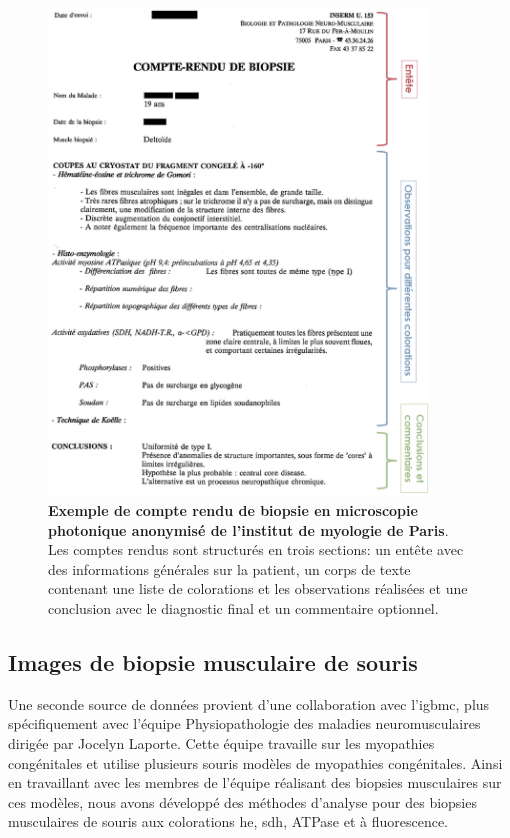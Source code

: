 \begin{figure}[!htbp]
 \centering
 \includegraphics[width=0.9\textwidth]{figures/compte_rendu_exemple.png}
 \caption[Exemple de compte rendu de biopsie]{\textbf{Exemple de compte rendu de biopsie en microscopie photonique anonymisé de l'institut de myologie de Paris}. Les comptes rendus sont structurés en trois sections: un entête avec des informations générales sur la patient, un corps de texte contenant une liste de colorations et les observations réalisées et une conclusion avec le diagnostic final et un commentaire optionnel.}
 \label{fig:compte-rendu-exemple}
\end{figure}

\subsection{Images de biopsie musculaire de souris}
Une seconde source de données provient d'une collaboration avec l'\gls{igbmc}, plus spécifiquement avec l'équipe Physiopathologie des maladies neuromusculaires dirigée par Jocelyn Laporte. Cette équipe travaille sur les myopathies congénitales et utilise plusieurs souris modèles de myopathies congénitales. Ainsi en travaillant avec les membres de l'équipe réalisant des biopsies musculaires sur ces modèles, nous avons développé des méthodes d'analyse pour des biopsies musculaires de souris aux colorations \gls{he}, \gls{sdh}, ATPase et à fluorescence.

